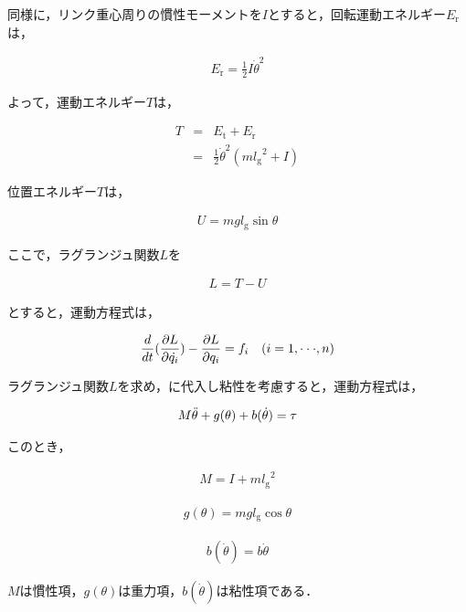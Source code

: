 同様に，リンク重心周りの慣性モーメントを$I$とすると，回転運動エネルギー$E_{\mathrm{r}}$は，

\begin{eqnarray}
  E_{\mathrm{r}} 
  =\frac{1}{2}I{\dot{\theta}}^2
\end{eqnarray}

よって，運動エネルギー$T$は，

\begin{eqnarray}
  T
  &=&E_{\mathrm{t}} + E_{\mathrm{r}} \nonumber \\
  &=&\frac{1}{2}{\dot{\theta}}^2(m{l_{\mathrm{g}}}^2 + I)
\end{eqnarray}

位置エネルギー$T$は，

\begin{eqnarray}
  U
  = mgl_{\mathrm{g}}\sin\theta
\end{eqnarray}

ここで，ラグランジュ関数$L$を

\begin{eqnarray}
  L
  =T - U
\end{eqnarray}

とすると，運動方程式は，

\begin{eqnarray}
  \equlabel{3.8}
  \frac{d}{dt}(\frac{\partial L}{\partial \dot{q_{i}}}) - \frac{\partial L}{\partial q_{i}} = f_{i} \quad (i = 1,\cdot\cdot\cdot, n)
\end{eqnarray}

ラグランジュ関数$L$を求め，に代入し粘性を考慮すると，運動方程式は，

\begin{eqnarray}
  \equlabel{3.9}
  M\ddot{\theta} + g(\theta) + b(\dot{\theta}) = \tau
\end{eqnarray}

このとき，

\begin{eqnarray}
  M = I + m{l_{\mathrm{g}}}^2
\end{eqnarray}

\begin{eqnarray}
  g(\theta) = mgl_{\mathrm{g}}\cos\theta
\end{eqnarray}

\begin{eqnarray}
  b(\dot{\theta}) = b\dot{\theta}
\end{eqnarray}

$M$は慣性項，$g(\theta)$は重力項，$b(\dot{\theta})$は粘性項である．

